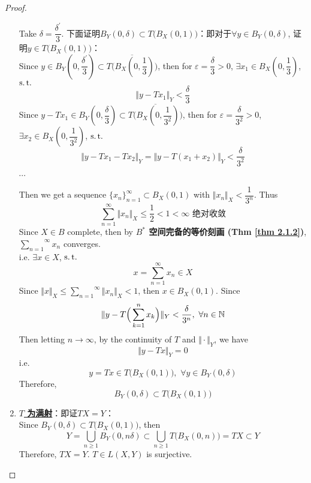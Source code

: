 \begin{thm}
\begin{proof}
\begin{enumerate}
				Take $\delta = \dfrac{\delta^{'}}{3}$. 下面证明$B_Y(0 , \delta) \subset T \Big( B_X (0 , 1) \Big)$：即对于$\forall y \in B_Y(0 , \delta)$, 证明$y \in T \Big( B_X(0 , 1) \Big)$：\\
				Since $y \in B_Y(0 , \dfrac{\delta^{'}}{3}) \subset \overline{T \Big( B_X(0 , \dfrac{1}{3}) \Big)}$, then for $\varepsilon = \dfrac{\delta}{3} > 0$, $\exists x_1 \in B_X(0 , \dfrac{1}{3})$, $\operatorname{s.t.}$
				\[ \Vert y - Tx_1 \Vert_Y < \frac{\delta}{3} \]
				Since $y - Tx_1 \in B_Y(0 , \dfrac{\delta}{3}) \subset \overline{T \Big( B_X (0 , \dfrac{1}{3^2}) \Big)}$, then for $\varepsilon = \dfrac{\delta}{3^2} > 0$, $\exists x_2 \in B_X(0 , \dfrac{1}{3^2})$, $\operatorname{s.t.}$ 
				\[ \Vert y - Tx_1 - Tx_2 \Vert_Y = \Vert y - T(x_1 + x_2) \Vert_Y < \frac{\delta}{3^2} \]
				\begin{center}
					$\cdots$ 
				\end{center}
				Then we get a sequence $\{ x_n \}_{n = 1}^{\infty} \subset B_X(0 , 1)$ with $\Vert x_n \Vert_X < \dfrac{1}{3^n}$. Thus
				\[ \sum_{n = 1}^{\infty} \Vert x_n \Vert_X \leq \frac{1}{2} < 1 < \infty \,\, \text{绝对收敛} \]
				Since $X \in B$ complete, then by \textbf{$B^*$ 空间完备的等价刻画 (Thm \ref{thm 2.1.2})}, $\overset{\infty}{\underset{n = 1}{\sum}} x_n$ converges.\\ 
				i.e. $\exists x \in X$, $\operatorname{s.t.}$
				\[ x = \sum_{n = 1}^{\infty} x_n \in X \]
				Since $\Vert x \Vert_X \leq \overset{\infty}{\underset{n = 1}{\sum}} \Vert x_n \Vert_X < 1$, then $x \in B_X(0 , 1)$. Since 
				\[ \Vert y - T \Big( \sum_{k = 1}^n x_k \Big) \Vert_Y < \frac{\delta}{3^n} , \,\, \forall n \in \mathbb{N} \]
				Then letting $n \to \infty$, by the continuity of $T$ and $\Vert \cdot \Vert_Y$, we have
				\[ \Vert y - Tx \Vert_Y = 0 \]
				i.e. 
				\[ y = Tx \in T \Big( B_X(0 , 1) \Big) , \,\, \forall y \in B_Y(0 , \delta) \]
				Therefore, 
				\[ B_Y(0 , \delta) \subset T \Big( B_X(0 , 1) \Big) \]
				
				\vspace*{2.5em}
				
				\item \underline{\textbf{$T$ 为满射}}：即证$TX = Y$：\\
				Since $B_Y(0 , \delta) \subset T \Big( B_X(0 , 1) \Big)$, then
				\[ Y = \bigcup_{n \geq 1} B_Y(0 , n \delta) 
				\subset \bigcup_{n \geq 1} T \Big( B_X(0 , n) \Big) 
				= TX \subset Y \]
				Therefore, $TX = Y$. $T \in L(X , Y)$ is surjective.
			\end{enumerate}
		\end{proof}
	\end{thm}


	\ifx\allfiles\undefined

\fi